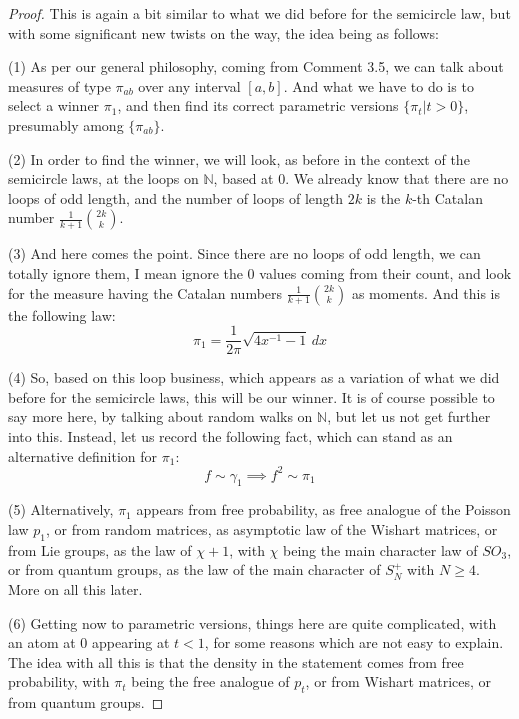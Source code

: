 \documentclass[12pt]{amsbook}
\begin{document}
\begin{proof}
This is again a bit similar to what we did before for the semicircle law, but with some significant new twists on the way, the idea being as follows:

\medskip

(1) As per our general philosophy, coming from Comment 3.5, we can talk about measures of type $\pi_{ab}$ over any interval $[a,b]$. And what we have to do is to select a winner $\pi_1$, and then find its correct parametric versions $\{\pi_t|t>0\}$, presumably among $\{\pi_{ab}\}$.

\medskip

(2) In order to find the winner, we will look, as before in the context of the semicircle laws, at the loops on $\mathbb N$, based at $0$. We already know that there are no loops of odd length, and the number of loops of length $2k$ is the $k$-th Catalan number $\frac{1}{k+1}\binom{2k}{k}$. 

\medskip

(3) And here comes the point. Since there are no loops of odd length, we can totally ignore them, I mean ignore the 0 values coming from their count, and look for the measure having the Catalan numbers $\frac{1}{k+1}\binom{2k}{k}$ as moments. And this is the following law:
$$\pi_1=\frac{1}{2\pi}\sqrt{4x^{-1}-1}\,dx$$

(4) So, based on this loop business, which appears as a variation of what we did before for the semicircle laws, this will be our winner. It is of course possible to say more here, by talking about random walks on $\mathbb N$, but let us not get further into this. Instead, let us record the following fact, which can stand as an alternative definition for $\pi_1$:
$$f\sim\gamma_1\implies f^2\sim\pi_1$$

(5) Alternatively, $\pi_1$ appears from free probability, as free analogue of the Poisson law $p_1$, or from random matrices, as asymptotic law of the Wishart matrices, or from Lie groups, as the law of $\chi+1$, with $\chi$ being the main character law of $SO_3$, or from quantum groups, as the law of the main character of $S_N^+$ with $N\geq4$. More on all this later.

\medskip

(6) Getting now to parametric versions, things here are quite complicated, with an atom at $0$ appearing at $t<1$, for some reasons which are not easy to explain. The idea with all this is that the density in the statement comes from free probability, with $\pi_t$ being the free analogue of $p_t$, or from Wishart matrices, or from quantum groups.


\end{proof}
\end{document}
